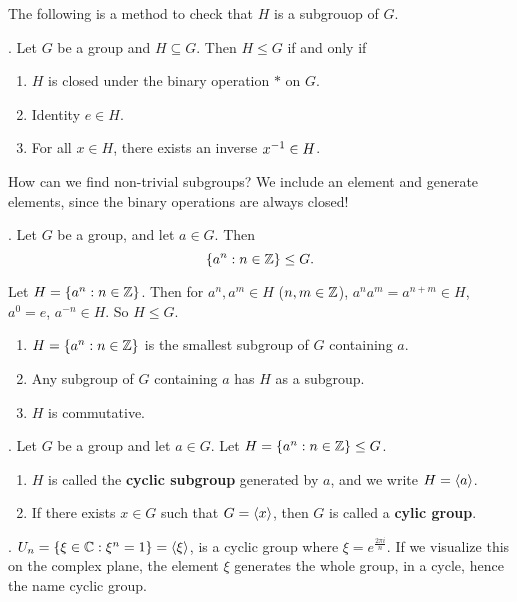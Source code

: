 The following is a method to check that \(H\) is a subgrouop of \(G\).

\thm. Let \(G\) be a group and \(H \subseteq G\). Then \(H \leq G\) if and only if
\begin{enumerate}
    \item \(H\) is closed under the binary operation \(*\) on \(G\).
    \item Identity \(e \in H\).
    \item For all \(x \in H\), there exists an inverse \(x^{-1} \in H\).
\end{enumerate}

How can we find non-trivial subgroups? We include an element and generate elements, since the binary operations are always closed!

\thm. Let \(G\) be a group, and let \(a \in G\). Then
\[
    \{a^n : n \in \mathbb{Z}\} \leq G.
\]

\pf Let \(H = \{a^n : n \in \mathbb{Z}\}\). Then for \(a^n, a^m \in H\) (\(n, m \in \mathbb{Z}\)), \(a^na^m = a^{n+m} \in H\), \(a^0 = e\), \(a^{-n} \in H\). So \(H \leq G\).

\rmk
\begin{enumerate}
    \item \(H = \{a^n : n \in \mathbb{Z}\}\) is the smallest subgroup of \(G\) containing \(a\).
    \item Any subgroup of \(G\) containing \(a\) has \(H\) as a subgroup.
    \item \(H\) is commutative.
\end{enumerate}

.  Let \(G\) be a group and let \(a \in G\). Let \(H = \{a^n : n \in \mathbb{Z}\} \leq G\).
\begin{enumerate}
    \item \(H\) is called the \textbf{cyclic subgroup} generated by \(a\), and we write \(H = \left\langle a \right\rangle\).
    \item If there exists \(x \in G\) such that \(G = \left\langle x \right\rangle\), then \(G\) is called a \textbf{cylic group}.
\end{enumerate}

\ex. \(U_n = \{\xi \in \mathbb{C} : \xi^n = 1\} = \left\langle \xi \right\rangle\), is a cyclic group where \(\xi = e^{\frac{2\pi i}{n}}\). If we visualize this on the complex plane, the element \(\xi\) generates the whole group, in a cycle, hence the name cyclic group.
\pagebreak
